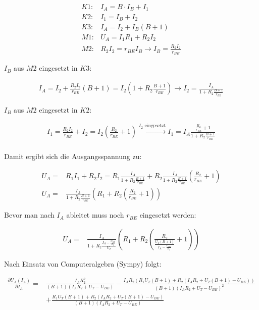 \begin{align*}
    K1:& I_A = B \cdot I_B + I_1 \\
    K2:& I_1 = I_B + I_2 \\
    K3:& I_A = I_2 + I_B (B+1)\\
    M1:& U_A = I_1 R_1 + R_2 I_2 \\
    M2:& R_2 I_2 = r_{BE} I_B \rightarrow I_B = \frac{R_2 I_2}{r_{BE}}
\end{align*}

$I_B$ aus $M2$ eingesetzt in $K3$:

\begin{align*}
    I_A = I_2 + \frac{R_2 I_2}{r_{BE}} (B+1) = I_2 \left( 1 + R_2\frac{B+1}{r_{BE}}\right) \rightarrow I_2 = \frac{I_A}{1 + R_2\frac{B+1}{r_{BE}}}
\end{align*}

$I_B$ aus $M2$ eingesetzt in $K2$:

\begin{align*}
    I_1 = \frac{R_2 I_2}{r_{BE}} + I_2 = I_2 \left( \frac{R_2}{r_{BE}} + 1 \right) \xrightarrow[]{I_2 \text{ eingesetzt}} I_1 = I_A \frac{\frac{R_2}{r_{BE}} + 1}{1 + R_2\frac{B+1}{r_{BE}}} \\
\end{align*}

Damit ergibt sich die Ausgangsspannung zu: 

\begin{align*}
    U_A =& R_1 I_1 + R_2 I_2 = R_1 \frac{I_A}{1 + R_2\frac{B+1}{r_{BE}}} + R_2 \frac{I_A}{1 + R_2\frac{B+1}{r_{BE}}} \left( \frac{R_2}{r_{BE}} + 1 \right)\\
    U_A =& \frac{I_A}{1 + R_2\frac{B+1}{r_{BE}}} \left( R_1 + R_2 \left( \frac{R_2}{r_{BE}} + 1 \right) \right)
\end{align*}

Bevor man nach $I_A$ ableitet muss noch $r_{BE}$ eingesetzt werden:

\begin{align*}
    U_A =& \frac{I_A}{1 + R_2
    \frac{I_A - \frac{U_{BE}}{R_2}}{U_T}
    } \left( R_1 + R_2 \left( \frac{R_2}{\frac{U_T (B+1)}{I_A - \frac{U_{BE}}{R_2}}} + 1 \right) \right)
\end{align*}

Nach Einsatz von Computeralgebra (Sympy) folgt: 

\begin{align}
    \frac{\partial U_A (I_A)}{\partial I_A} =& \frac{I_{A} R_{2}^{2}}{\left(B + 1\right) \left(I_{A} R_{2} + U_{T} - U_{BE}\right)} - \frac{I_{A} R_{2} \left(R_{1} U_{T} \left(B + 1\right) + R_{2} \left(I_{A} R_{2} + U_{T} \left(B + 1\right) - U_{BE}\right)\right)}{\left(B + 1\right) \left(I_{A} R_{2} + U_{T} - U_{BE}\right)^{2}} \nonumber\\ &+ \frac{R_{1} U_{T} \left(B + 1\right) + R_{2} \left(I_{A} R_{2} + U_{T} \left(B + 1\right) - U_{BE}\right)}{\left(B + 1\right) \left(I_{A} R_{2} + U_{T} - U_{BE}\right)} \label{dIA_complex}
\end{align}

